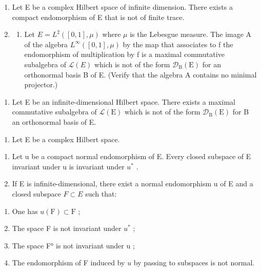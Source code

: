 \begin{enumerate}
\def\labelenumi{\arabic{enumi})}
\setcounter{enumi}{3}
\item
  Let E be a complex Hilbert space of infinite dimension. There exists a compact endomorphism of E that is not of finite trace.
\item
  \begin{enumerate}
  \def\labelenumii{\alph{enumii})}
  \tightlist
  \item
  Let \(E = L^{2}([0,1], \mu)\) where \(\mu\) is the Lebesgue measure. The image A of the algebra \(L^{\infty}([0,1], \mu)\) by the map that associates to f the endomorphism of multiplication by f is a maximal commutative subalgebra of \(\mathcal{L}(E)\) which is not of the form \(\mathcal{D}_{\mathrm{B}}(\mathrm{E})\) for an orthonormal basis B of E. (Verify that the algebra A contains no minimal projector.)
  \end{enumerate}
\end{enumerate}

\begin{enumerate}
\def\labelenumi{\alph{enumi})}
\setcounter{enumi}{1}
\tightlist
\item
  Let E be an infinite-dimensional Hilbert space. There exists a maximal commutative subalgebra of \(\mathcal{L}(\mathrm{E})\) which is not of the form \(\mathcal{D}_{\mathrm{B}}(\mathrm{E})\) for B an orthonormal basis of E.
\end{enumerate}

\begin{enumerate}
\def\labelenumi{\arabic{enumi})}
\setcounter{enumi}{5}
\tightlist
\item
  Let E be a complex Hilbert space.
\end{enumerate}

\begin{enumerate}
\def\labelenumi{\alph{enumi})}
\item
  Let u be a compact normal endomorphism of E. Every closed subspace of E invariant under u is invariant under \(u^{*}\) .
\item
  If E is infinite-dimensional, there exist a normal endomorphism u of E and a closed subspace \(F \subset E\) such that:
\end{enumerate}

\begin{enumerate}
\def\labelenumi{(\roman{enumi})}
\item
  One has \(u(\mathrm{F}) \subset \mathrm{F}\) ;
\item
  The space F is not invariant under \(u^{*}\) ;
\item
  The space F° is not invariant under u ;
\item
  The endomorphism of F induced by \(u\) by passing to subspaces is not normal.
\end{enumerate}

